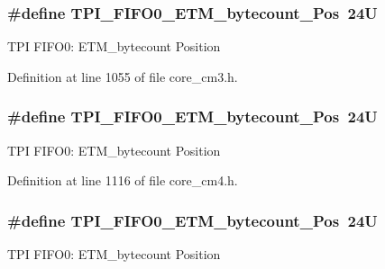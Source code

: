 \subsubsection[{\texorpdfstring{T\+P\+I\+\_\+\+F\+I\+F\+O0\+\_\+\+E\+T\+M\+\_\+bytecount\+\_\+\+Pos}{TPI_FIFO0_ETM_bytecount_Pos}}]{\setlength{\rightskip}{0pt plus 5cm}\#define T\+P\+I\+\_\+\+F\+I\+F\+O0\+\_\+\+E\+T\+M\+\_\+bytecount\+\_\+\+Pos~24U}\hypertarget{group___c_m_s_i_s___t_p_i_ga2f738e45386ebf58c4d406f578e7ddaf}{}\label{group___c_m_s_i_s___t_p_i_ga2f738e45386ebf58c4d406f578e7ddaf}
T\+PI F\+I\+F\+O0\+: E\+T\+M\+\_\+bytecount Position 

Definition at line 1055 of file core\+\_\+cm3.\+h.

\subsubsection[{\texorpdfstring{T\+P\+I\+\_\+\+F\+I\+F\+O0\+\_\+\+E\+T\+M\+\_\+bytecount\+\_\+\+Pos}{TPI_FIFO0_ETM_bytecount_Pos}}]{\setlength{\rightskip}{0pt plus 5cm}\#define T\+P\+I\+\_\+\+F\+I\+F\+O0\+\_\+\+E\+T\+M\+\_\+bytecount\+\_\+\+Pos~24U}\hypertarget{group___c_m_s_i_s___t_p_i_ga2f738e45386ebf58c4d406f578e7ddaf}{}\label{group___c_m_s_i_s___t_p_i_ga2f738e45386ebf58c4d406f578e7ddaf}
T\+PI F\+I\+F\+O0\+: E\+T\+M\+\_\+bytecount Position 

Definition at line 1116 of file core\+\_\+cm4.\+h.

\subsubsection[{\texorpdfstring{T\+P\+I\+\_\+\+F\+I\+F\+O0\+\_\+\+E\+T\+M\+\_\+bytecount\+\_\+\+Pos}{TPI_FIFO0_ETM_bytecount_Pos}}]{\setlength{\rightskip}{0pt plus 5cm}\#define T\+P\+I\+\_\+\+F\+I\+F\+O0\+\_\+\+E\+T\+M\+\_\+bytecount\+\_\+\+Pos~24U}\hypertarget{group___c_m_s_i_s___t_p_i_ga2f738e45386ebf58c4d406f578e7ddaf}{}\label{group___c_m_s_i_s___t_p_i_ga2f738e45386ebf58c4d406f578e7ddaf}
T\+PI F\+I\+F\+O0\+: E\+T\+M\+\_\+bytecount Position 

